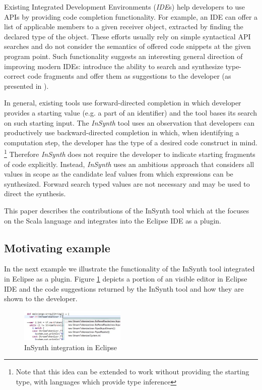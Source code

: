 \documentclass[preprint, nocopyrightspace]{sigplanconf}
\newcommand\Lang[1]{\textsl{#1}}
\begin{document}
Existing Integrated Development Environments (\Lang{IDE}s) help developers to use APIs by providing code completion functionality.
For example, an IDE can offer a list of applicable members to a given receiver object, extracted by finding the declared type of the object.
These efforts usually rely on simple syntactical API searches and do not consider the semantics of offered code snippets at the given program point.
Such functionality suggests an interesting general direction of improving modern IDEs:
introduce the ability to search and synthesize type-correct code fragments and offer them as suggestions to the developer (as presented in \cite{EPFL-REPORT-170040}).

In general, existing tools use forward-directed completion in which developer provides a starting value (e.g. a part of an identifier) and the tool bases its search on such starting input.
The \Lang{InSynth} tool uses an observation that developers can productively use backward-directed completion in which, when identifying a computation step, the developer has the type of a desired code construct in mind.
\footnote{Note that this idea can be extended to work without providing the starting type, with languages which provide type inference}
Therefore \Lang{InSynth} does not require the developer to indicate starting fragments of code explicitly. 
Instead, \Lang{InSynth} uses an ambitious approach that considers all values in scope as the candidate leaf values from which expressions can be synthesized.
Forward search typed values are not necessary and may be used to direct the synthesis.


This paper describes the contributions of the InSynth tool which at the focuses on the Scala language \cite{odersky:scala} and integrates into the Eclipse IDE \cite{eclipse_foundation} as a plugin. 

\subsection{Motivating example}

In the next example we illustrate the functionality of the InSynth tool integrated in Eclipse as a plugin.
Figure \ref{fig:Eclipse_example} depicts a portion of an visible editor in Eclipse IDE and the code suggestions returned by the InSynth tool and how they are shown to the developer. 

\begin{figure}[ht]
\centering
\includegraphics[width=0.45\textwidth]{eclipse}
\caption{InSynth integration in Eclipse}
\label{fig:Eclipse_example}
\end{figure}
\end{document}
